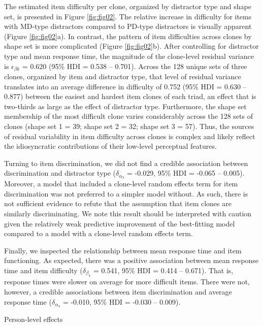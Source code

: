 \documentclass[a4paper,man,natbib]{apa6}
\makeatletter
\renewcommand{\subsubsection}{\@startsection{subsubsection}{3}
  {\z@}%
  {\b@level@two@skip}{\e@level@two@skip}%
  {\normalfont\normalsize\bfseries}}
\makeatother
\begin{document}
The estimated item difficulty per clone, organized by distractor type and shape set, is presented in Figure \ref{fig:fig02}. The relative increase in difficulty for items with MD-type distractors compared to PD-type distractors is visually apparent (Figure \ref{fig:fig02}a). In contrast, the pattern of item difficulties across clones by shape set is more complicated (Figure \ref{fig:fig02}b). After controlling for distractor type and mean response time, the magnitude of the clone-level residual variance is $\epsilon_{\beta k}$ = 0.620 (95\% HDI = 0.538 -- 0.701). Across the 128 unique sets of three clones, organized by item and distractor type, that level of residual variance translates into an average difference in difficulty of 0.752 (95\% HDI = 0.630 -- 0.877) between the easiest and hardest item clones of each triad, an effect that is two-thirds as large as the effect of distractor type. Furthermore, the shape set membership of the most difficult clone varies considerably across the 128 sets of clones (shape set 1 = 39; shape set 2 = 32; shape set 3 = 57). Thus, the sources of residual variability in item difficulty across clones is complex and likely reflect the idiosyncratic contributions of their low-level perceptual features. 

Turning to item discrimination, we did not find a credible association between discrimination and distractor type ($\delta_{\alpha_3}$ = -0.029, 95\% HDI = -0.065 -- 0.005). Moreover, a model that included a clone-level random effects term for item discrimination was not preferred to a simpler model without. As such, there is not sufficient evidence to refute that the assumption that item clones are similarly discriminating. We note this result should be interpreted with caution given the relatively weak predictive improvement of the best-fitting model compared to a model with a clone-level random effects term.

Finally, we inspected the relationship between mean response time and item functioning. As expected, there was a positive association between mean response time and item difficulty ($\delta_{\beta_4}$ = 0.541, 95\% HDI = 0.414 -- 0.671). That is, response times were slower on average for more difficult items. There were not, however, a credible associations between item discrimination and average response time ($\delta_{\alpha_4}$ = -0.010, 95\% HDI = -0.030 -- 0.009).

\subsubsection{Person-level effects}
\end{document}
